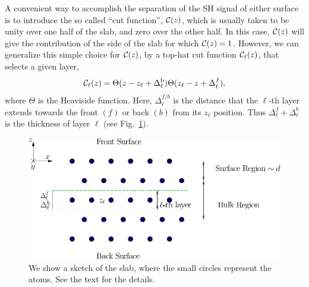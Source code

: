 \documentclass{article}
\begin{document}
A convenient way to accomplish the separation of the SH signal of
either surface is to introduce
the so called
``cut function'', ${\mathbf{\cal C}}(z)$, which is usually taken to be unity over one half
of the slab, and zero over the other half.
In this case, ${\mathbf{\cal C}}(z)$ will give the contribution of the side of the
slab for which ${\mathbf{\cal C}}(z)=1$. However, we can generalize this simple choice
for ${\mathbf{\cal C}}(z)$, 
by a top-hat cut function
${\mathbf{\cal C}}_\ell(z)$, that selects a given layer,
\begin{equation}
\label{sz}
{\mathbf{\cal C}}_\ell(z)=\Theta(z-z_\ell+\Delta_\ell^{\mathrm{b}})
            \Theta(z_\ell-z+\Delta_\ell^f),
\end{equation}
where $\Theta$ is the Heaviside function. Here, $\Delta_\ell^{f/b}$
is the distance that the $\ell$-th layer extends towards the front
$(f)$ or back $(b)$ from its $z_\ell$ position.  Thus
$\Delta_\ell^f+\Delta_\ell^b$ is the thickness of layer $\ell$
(see Fig.~\ref{fslab}).
\begin{figure}[b]
\centering
\includegraphics[scale=.7]{images/slab}
\caption{
We show a sketch of the slab, where the small
circles represent the atoms. See the text for the details.
}
\label{fslab}
\end{figure}
\end{document}
